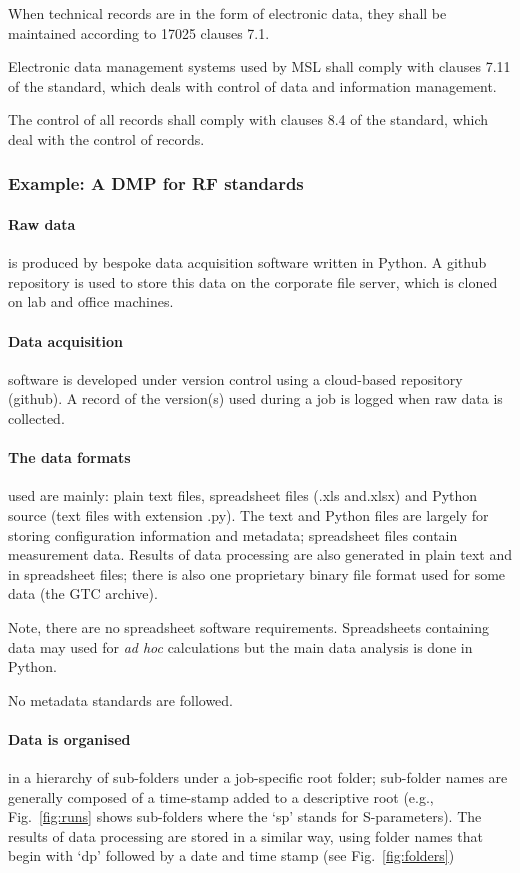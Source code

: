 When technical records are in the form of electronic data, they shall be maintained according to 17025 clauses 7.1.

Electronic data management systems used by MSL shall comply with clauses 7.11 of the standard, which deals with control of data and information management.

The control of all records shall comply with clauses 8.4 of the standard, which deal with the control of records.

\subsubsection{Example: A DMP for RF standards}
\paragraph{Raw data} is produced by bespoke data acquisition software written in Python. A github repository is used to store this data on the corporate file server, which is cloned on lab and office machines. 

\paragraph{Data acquisition} software is developed under version control using a cloud-based repository (github). A record of the version(s) used during a job is logged when raw data is collected.  

\paragraph{The data formats} used are mainly: plain text files, spreadsheet files (.xls and.xlsx) and Python source (text files with extension .py). The text and Python files are largely for storing configuration information and metadata; spreadsheet files contain measurement data. Results of data processing are also generated in plain text and in spreadsheet files; there is also one proprietary binary file format used for some data (the GTC archive). 

Note, there are no spreadsheet software requirements. Spreadsheets containing data may used for \textit{ad hoc} calculations but the main data analysis is done in Python. 

No metadata standards are followed. 

\paragraph{Data is organised} in a hierarchy of sub-folders under a job-specific root folder; sub-folder names are generally composed of a time-stamp added to a descriptive root (e.g., Fig.~\ref{fig:runs} shows sub-folders where the `sp' stands for S-parameters). The results of data processing are stored in a similar way, using folder names that begin
with `dp' followed by a date and time stamp (see Fig.~\ref{fig:folders}) 

